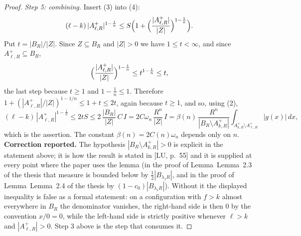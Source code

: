 \begin{proof}
\emph{Step 5: combining.}  Insert (3) into (4):
\[
(\ell-k)\,|A^+_{\ell,R}|^{1-\frac1n}
\le S\Bigl(1+\Bigl(\frac{|A^+_{\ell,R}|}{|Z|}\Bigr)^{1-\frac1n}\Bigr) .
\]
Put $t=|B_R|/|Z|$.  Since $Z\subseteq B_R$ and $|Z|>0$ we have $1\le t<\infty$,
and since $A^+_{\ell,R}\subseteq B_R$,
\[
\Bigl(\frac{|A^+_{\ell,R}|}{|Z|}\Bigr)^{1-\frac1n}\le t^{1-\frac1n}\le t ,
\]
the last step because $t\ge1$ and $1-\frac1n\le1$.  Therefore
$1+(|A^+_{\ell,R}|/|Z|)^{1-1/n}\le1+t\le2t$, again because $t\ge1$, and so, using
(2),
\[
(\ell-k)\,|A^+_{\ell,R}|^{1-\frac1n}
\le 2tS
\le 2\,\frac{|B_R|}{|Z|}\,C\,I
= 2C\omega_n\,\frac{R^n}{|Z|}\,I
= \beta(n)\,\frac{R^n}{|B_R\setminus A^+_{k,R}|}
\int_{A^+_{k,R}\setminus A^+_{\ell,R}}|g(x)|\,dx ,
\]
which is the assertion.  The constant $\beta(n)=2C(n)\omega_n$ depends only on
$n$.
\medskip
\noindent\textbf{Correction reported.}  The hypothesis
$|B_R\setminus A^+_{k,R}|>0$ is explicit in the statement above; it is how the
result is stated in [LU, p.~55] and it is supplied at every point where the
paper uses the lemma (in the proof of Lemma~Lemma~2.3 of the thesis that measure is
bounded below by $\tfrac12|B_{\lambda_1R}|$, and in the proof of
Lemma~Lemma~2.4 of the thesis by $(1-c_0)|B_{\lambda_1R}|$).  Without it the displayed
inequality is false as a formal statement: on a configuration with $f>k$ almost
everywhere in $B_R$ the denominator vanishes, the right-hand side is then $0$ by
the convention $x/0=0$, while the left-hand side is strictly positive whenever
$\ell>k$ and $|A^+_{\ell,R}|>0$.  Step 3 above is the step that consumes it.
\end{proof}
